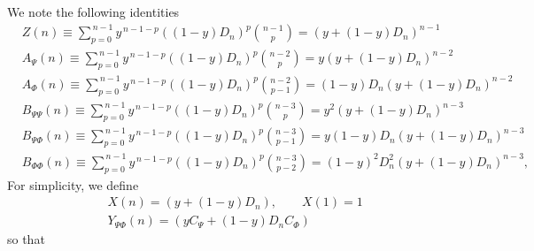 \documentclass[11pt]{article}
\newcommand{\nn}{\nonumber}
\begin{document}
We note the following identities
  \begin{align}
     & Z(n)\equiv \sum_{p=0}^{\,n-1}y^{\,n-1-p}((1-y)D_{n})^{p}\binom{n-1}{p}= (y+(1-y) D_{n})^{n-1}                                 \\
     & A_{\Psi}(n)\equiv \sum_{p=0}^{\,n-1}y^{\,n-1-p}((1-y)D_{n})^{p}\binom{n-2}{p}=y(y+(1-y) D_{n})^{n-2} \                       \\
     & A_{\Phi}(n)\equiv \sum_{p=0}^{\,n-1}y^{\,n-1-p}((1-y)D_{n})^{p}\binom{n-2}{p-1}=(1-y)D_{n}(y+(1-y) D_{n})^{n-2}              \\
     & B_{\Psi\Psi}(n)\equiv\sum_{p=0}^{\,n-1}y^{\,n-1-p}((1-y)D_{n})^{p}\binom{n-3}{p}= y^{2}(y+(1-y)D_{n})^{n-3}               \\
     & B_{\Psi\Phi}(n)\equiv\sum_{p=0}^{\,n-1}y^{\,n-1-p}((1-y)D_{n})^{p}\binom{n-3}{p-1}= y(1-y) D_{n}(y+(1-y)D_{n})^{n-3}       \\
     & B_{\Phi\Phi}(n)\equiv\sum_{p=0}^{\,n-1}y^{\,n-1-p}((1-y)D_{n})^{p}\binom{n-3}{p-2}= (1-y)^{2}D_{n}^{2}(y+(1-y)D_{n})^{n-3}, 
  \end{align}
  For simplicity, we define
  \begin{align}
     & X(n)=(y+(1-y)D_{n}), \qquad X(1)=1\nn                 \\
     & Y_{\Psi\Phi}(n)=(y C_{\Psi}+(1-y)D_{n}C_{\Phi}) 
  \end{align}
  so that
\end{document}
